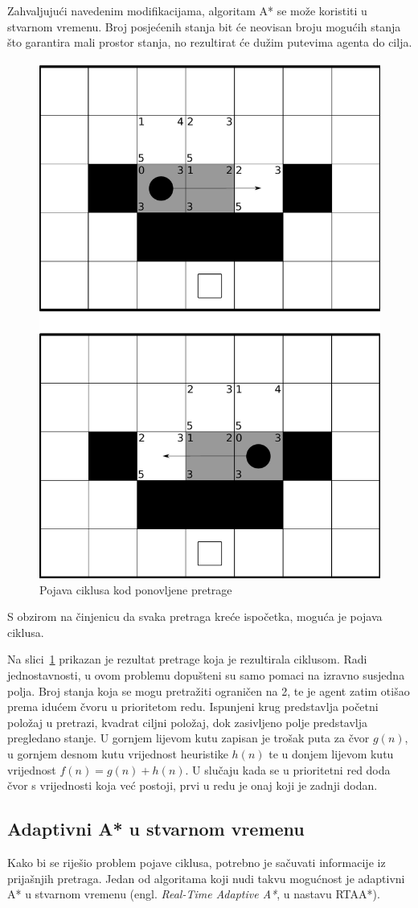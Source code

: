 \documentclass[times, utf8, zavrsni, numeric]{fer}
\begin{document}
\par Zahvaljujući navedenim modifikacijama, algoritam A* se može koristiti u stvarnom vremenu. 
Broj posjećenih stanja bit će neovisan broju mogućih stanja što garantira mali prostor stanja, no rezultirat će dužim putevima agenta do cilja.

\begin{figure}[h]
	\centering
	\includegraphics[width=0.45\linewidth]{images/repeatedAStarCycle.pdf}
	\caption{Pojava ciklusa kod ponovljene pretrage}
	\label{fig:pathfindingCycle}
\end{figure} 

\par S obzirom na činjenicu da svaka pretraga kreće ispočetka, moguća je pojava ciklusa. 

\par Na slici~\ref{fig:pathfindingCycle} prikazan je rezultat pretrage koja je rezultirala ciklusom. 
Radi jednostavnosti, u ovom problemu dopušteni su samo pomaci na izravno susjedna polja.
Broj stanja koja se mogu pretražiti ograničen na 2, te je agent zatim otišao prema idućem čvoru u prioritetom redu. 
Ispunjeni krug predstavlja početni položaj u pretrazi, kvadrat ciljni položaj, dok zasivljeno polje predstavlja pregledano stanje. 
U gornjem lijevom kutu zapisan je trošak puta za čvor \(g(n)\), u gornjem desnom kutu vrijednost heuristike \(h(n)\) te u donjem lijevom kutu vrijednost \(f(n) = g(n) + h(n)\).
U slučaju kada se u prioritetni red doda čvor s vrijednosti koja već postoji, prvi u redu je onaj koji je zadnji dodan.

\subsection{Adaptivni A* u stvarnom vremenu}
\par Kako bi se riješio problem pojave ciklusa, potrebno je sačuvati informacije iz prijašnjih pretraga.
Jedan od algoritama koji nudi takvu mogućnost je adaptivni A* u stvarnom vremenu (engl. \textit{Real-Time Adaptive A*}, u nastavu RTAA*).
\end{document}
